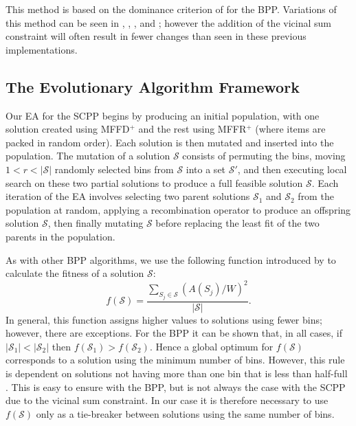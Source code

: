 \documentclass[a4paper,11pt,authoryear]{elsarticle}
\begin{document}
This method is based on the dominance criterion of \cite{martello1990l} for the BPP. Variations of this method can be seen in \cite{falkenauer1996}, \cite{levine2004}, \cite{lewis2009}, and \cite{lewis2017}; however the addition of the vicinal sum constraint will often result in fewer changes than seen in these previous implementations.

\subsection{The Evolutionary Algorithm Framework}
\label{sub:eaframework}

\noindent Our EA for the SCPP begins by producing an initial population, with one solution created using MFFD$^+$ and the rest using MFFR$^+$ (where items are packed in random order). Each solution is then mutated and inserted into the population. The mutation of a solution $\mathcal{S}$ consists of permuting the bins, moving $1 < r < |\mathcal{S}|$ randomly selected bins from $\mathcal{S}$ into a set $\mathcal{S}'$, and then executing local search on these two partial solutions to produce a full feasible solution $\mathcal{S}$. Each iteration of the EA involves selecting two parent solutions $\mathcal{S}_1$ and $\mathcal{S}_2$ from the population at random, applying a recombination operator to produce an offspring solution $\mathcal{S}$, then finally mutating $\mathcal{S}$ before replacing the least fit of the two parents in the population.

As with other BPP algorithms, we use the following function introduced by \cite{falkenauer1992} to calculate the fitness of a solution $\mathcal{S}$:
\begin{equation}
f(\mathcal{S}) = \frac{\sum_{S_j \in \mathcal{S}} (A(S_j)/W)^2}{|\mathcal{S}|}.
\label{eqn:fitness}
\end{equation}
In general, this function assigns higher values to solutions using fewer bins; however, there are exceptions. For the BPP it can be shown that, in all cases, if $|\mathcal{S}_1| < |\mathcal{S}_2|$  then $f(\mathcal{S}_1) > f(\mathcal{S}_2)$. Hence a global optimum for $f(\mathcal{S})$ corresponds to a solution using the minimum number of bins. However, this rule is dependent on solutions not having more than one bin that is less than half-full \citep{falkenauer1998}. This is easy to ensure with the BPP, but is not always the case with the SCPP due to the vicinal sum constraint. In our case it is therefore necessary to use $f(\mathcal{S})$ only as a tie-breaker between solutions using the same number of bins.
\end{document}
